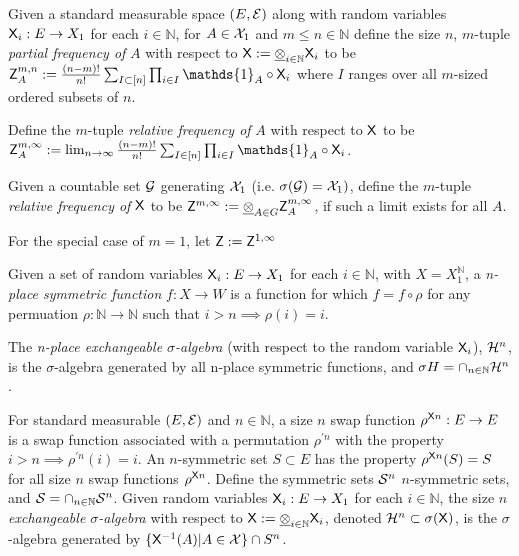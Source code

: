 \begin{definition}\label{def:partial_freq}
Given a standard measurable space $(E,\mathcal{E})$ along with random variables $\mathsf{X}_i:E\to X_1$ for each $i\in \mathbb{N}$, for $A\in \mathcal{X}_1$ and $m\leq n\in \mathbb{N}$ define the size $n$, $m$-tuple \emph{partial frequency of} $A$ with respect to $\mathsf{X}:=\underline{\otimes}_{i\in\mathbb{N}}\mathsf{X}_i$ to be $\RV{Z}^{m,n}_A:=\frac{(n-m)!}{n!}\sum_{I\subset [n]} \prod_{i\in I} \mathds{1}_A\circ \RV{X}_i$ where $I$ ranges over all $m$-sized ordered subsets of $n$.

Define the $m$-tuple \emph{relative frequency of } $A$ with respect to $\mathsf{X}$ to be $\RV{Z}^{m,\infty}_A:= \lim_{n\to \infty}\frac{(n-m)!}{n!}\sum_{I\in [n]} \prod_{i\in I} \mathds{1}_A\circ \RV{X}_i$.

Given a countable set $\mathcal{G}$ generating $\mathcal{X}_1$ (i.e. $\sigma(\mathcal{G})=\mathcal{X}_1)$, define the $m$-tuple \emph{relative frequency of} $\mathsf{X}$ to be $\mathsf{Z}^{m,\infty}:=\underline{\otimes}_{A\in G} \mathsf{Z}^{m,\infty}_A$, if such a limit exists for all $A$.

For the special case of $m=1$, let $\mathsf{Z}:=\mathsf{Z}^{1,\infty}$
\end{definition}

\begin{definition}\label{def:exchange_sig_alb}
Given a set of random variables $\mathsf{X}_i:E\to X_1$ for each $i\in \mathbb{N}$, with $X=X_1^{\mathbb{N}}$, a \emph{n-place symmetric function} $f:X\to W$ is a function for which $f = f\circ \rho$ for any permuation $\rho:\mathbb{N}\to\mathbb{N}$ such that $i>n\implies\rho(i)=i$. 

The \emph{n-place exchangeable $\sigma$-algebra} (with respect to the random variable $\mathsf{X}_i$), $\mathcal{H}^n$, is the $\sigma$-algebra generated by all n-place symmetric functions, and $\sigma{H}=\cap_{n\in \mathbb{N}} \mathcal{H}^n$. 

For standard measurable $(E,\mathcal{E})$ and $n\in \mathbb{N}$, a size $n$ swap function $\rho^{\mathsf{X}n}:E\to E$ is a swap function associated with a permutation $\rho^{\prime n}$ with the property $i>n\implies \rho^{\prime n}(i)=i$. An $n$-symmetric set $S\subset E$ has the property $\rho^{\mathsf{X}n}(S)=S$ for all size $n$ swap functions $\rho^{\mathsf{X}n}$. Define the symmetric sets $\mathcal{S}^n$ $n$-symmetric sets, and $\mathcal{S}=\cap_{n\in\mathbb{N}} \mathcal{S}^n$. Given random variables $\mathsf{X}_i:E\to X_1$ for each $i\in\mathbb{N}$, the size $n$ \emph{exchangeable $\sigma$-algebra} with respect to $\mathsf{X}:=\underline{\otimes}_{i\in\mathbb{N}}\mathsf{X}_i$, denoted $\mathcal{H}^n\subset\sigma(\mathsf{X})$, is the $\sigma$-algebra generated by $\{\mathsf{X}^{-1}(A)|A\in\mathcal{X}\}\cap S^n$.

\end{definition}


